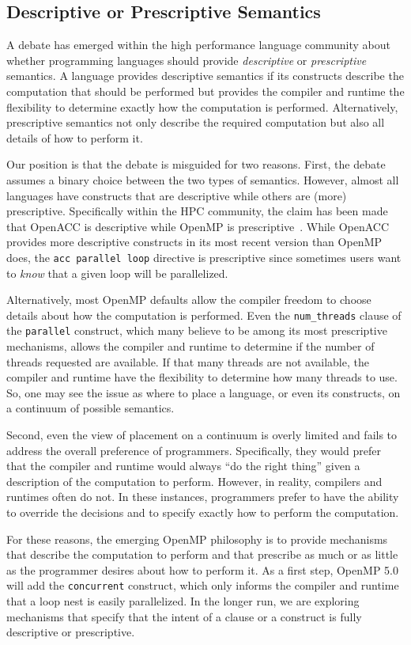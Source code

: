 \subsection{Descriptive or Prescriptive Semantics}
\label{sub:descriptive}

A debate has emerged within the high performance language
community about whether programming languages should 
provide \emph{descriptive} or \emph{prescriptive} semantics. 
A language provides descriptive semantics if its constructs 
describe the computation that should be performed but provides 
the compiler and runtime the flexibility to determine exactly 
how the computation is performed. Alternatively, prescriptive
semantics not only describe the required computation but 
also all details of how to perform it.

Our position is that the debate is misguided for two reasons.
First, the debate assumes a binary choice between the two 
types of semantics. However, almost all languages have constructs 
that are descriptive while others are (more) prescriptive. 
Specifically within the HPC community, the claim has been 
made that OpenACC is descriptive while OpenMP is
prescriptive~\cite{juckeland2016isc,wolfe16descriptive}. While OpenACC provides
more descriptive constructs in its most recent version than OpenMP does, the
\texttt{acc parallel loop} directive is prescriptive since sometimes users want
to \emph{know} that a given loop will be parallelized. 

Alternatively, most OpenMP defaults allow the compiler freedom
to choose details about how the computation is performed. Even
the \texttt{num\_threads} clause of the \texttt{parallel} construct,
which many believe to be among its most prescriptive mechanisms,
allows the compiler and runtime to determine if the number of
threads requested are available. If that many threads are not
available, the compiler and runtime have the flexibility to
determine how many threads to use. So, one may see the issue 
as where to place a language, or even its constructs, on a 
continuum of possible semantics.

Second, even the view of placement on a continuum is overly
limited and fails to address the overall preference of 
programmers. Specifically, they would prefer that the compiler
and runtime would always ``do the right thing'' given a 
description of the computation to perform. However, in reality,
compilers and runtimes often do not. In these instances,
programmers prefer to have the ability to override the
decisions and to specify exactly how to perform the computation.

For these reasons, the emerging OpenMP philosophy is to provide
mechanisms that describe the computation to perform and that
prescribe as much or as little as the programmer desires about
how to perform it. As a first step, OpenMP 5.0 will add the 
\texttt{concurrent} construct, which only informs the compiler 
and runtime that a loop nest is easily parallelized. In the 
longer run, we are exploring mechanisms that specify that the 
intent of a clause or a construct is fully descriptive or prescriptive.
